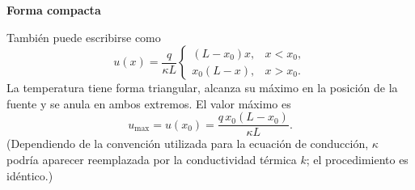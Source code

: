 \documentclass[11pt,spanish]{article}
\begin{document}
{\bf Forma compacta}

También puede escribirse como
$$
\boxed{
u(x)
=
\frac{q}{\kappa L}
\begin{cases}
(L-x_0)x, & x<x_0,\\
x_0(L-x), & x>x_0.
\end{cases}
}
$$
La temperatura tiene forma triangular, alcanza su máximo en la posición de la fuente y se anula en ambos extremos.
El valor máximo es
$$
\boxed{
u_{\max}=u(x_0)
=
\frac{q\,x_0(L-x_0)}{\kappa L}.
}
$$
(Dependiendo de la convención utilizada para la ecuación de conducción, $\kappa$ podría aparecer reemplazada por la conductividad térmica $k$; el procedimiento es idéntico.)



 
%
%
\end{document}
